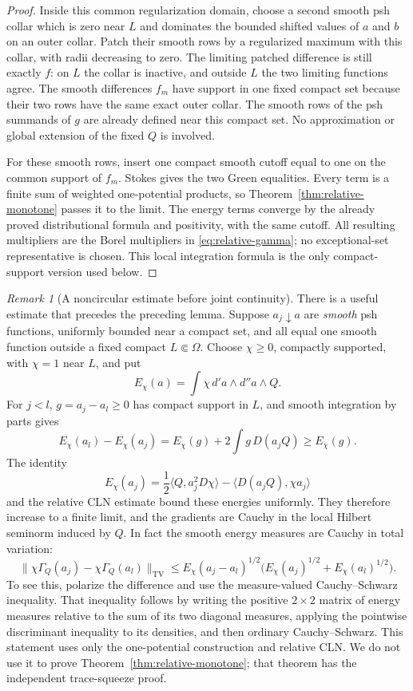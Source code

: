 \documentclass[11pt,a4paper]{article}
\numberwithin{equation}{section}
\theoremstyle{definition}
\theoremstyle{remark}
\newtheorem{remark}[theorem]{Remark}
\begin{document}
\begin{proof}
Inside this common regularization domain, choose a second smooth psh
collar which is zero near $L$ and dominates the bounded shifted values
of $a$ and $b$ on an outer collar. Patch their smooth rows by a
regularized maximum with this collar, with radii decreasing to zero.
The limiting patched difference is still exactly $f$: on $L$ the
collar is inactive, and outside $L$ the two limiting functions agree.
The smooth differences $f_m$ have support in one fixed compact set
because their two rows have the same exact outer collar. The smooth
rows of the psh summands of $g$ are already defined near this compact
set. No approximation or global extension of the fixed $Q$ is involved.

For these smooth rows, insert one compact smooth cutoff equal to one
on the common support of $f_m$. Stokes gives the two Green equalities.
Every term is a finite sum of weighted one-potential products, so
Theorem~\ref{thm:relative-monotone} passes it to the limit. The
energy terms converge by the already proved distributional formula
and positivity, with the same cutoff. All resulting multipliers are the
Borel multipliers in \eqref{eq:relative-gamma}; no exceptional-set
representative is chosen. This local integration formula is the only
compact-support version used below.
\end{proof}

\begin{remark}[A noncircular estimate before joint continuity]
\label{rem:energy-before-continuity}
There is a useful estimate that precedes the preceding lemma. Suppose
$a_j\downarrow a$ are \emph{smooth} psh functions, uniformly bounded
near a compact set, and all equal one smooth function outside a fixed
compact $L\Subset\Omega$. Choose $\chi\geq0$, compactly supported,
with $\chi=1$ near $L$, and put
\[
 E_\chi(a)=\int\chi\,d'a\wedge d''a\wedge Q.
\]
For $j<l$, $g=a_j-a_l\geq0$ has compact support in $L$, and smooth
integration by parts gives
\begin{equation}
\label{eq:smooth-energy-cauchy}
 E_\chi(a_l)-E_\chi(a_j)
   =E_\chi(g)+2\int g\,D(a_jQ)\geq E_\chi(g).
\end{equation}
The identity
\[
 E_\chi(a_j)=\frac12\langle Q,a_j^2D\chi\rangle
                  -\langle D(a_jQ),\chi a_j\rangle
\]
and the relative CLN estimate bound these energies uniformly. They
therefore increase to a finite limit, and the gradients are Cauchy
in the local Hilbert seminorm induced by $Q$. In fact the smooth
energy measures are Cauchy in total variation:
\[
 \|\chi\Gamma_Q(a_j)-\chi\Gamma_Q(a_l)\|_{\mathrm{TV}}
 \leq E_\chi(a_j-a_l)^{1/2}
       \bigl(E_\chi(a_j)^{1/2}+E_\chi(a_l)^{1/2}\bigr).
\]
To see this, polarize the difference and use the measure-valued
Cauchy--Schwarz inequality. That inequality follows by writing the
positive $2\times2$ matrix of energy measures relative to the sum of
its two diagonal measures, applying the pointwise discriminant
inequality to its densities, and then ordinary Cauchy--Schwarz.
This statement uses only the one-potential construction and relative
CLN. We do not use
it to prove Theorem~\ref{thm:relative-monotone}; that theorem has the
independent trace-squeeze proof.
\end{remark}
\end{document}
